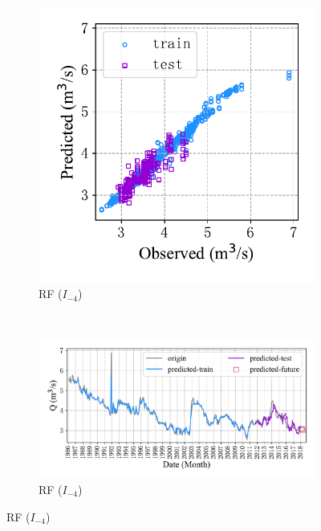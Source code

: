 \begin{figure}[!htbp]
\begin{subfigure}[b]{0.615\textwidth}
    \label{fig:spr_series_in_3_out_3_lstm}
  \end{subfigure}
  \\
  \begin{subfigure}[b]{0.305\textwidth}
    \includegraphics[width=\textwidth]{Img/chap4_spr/out3/spr_scatter_in_4_out_3_rf.pdf}
    \vspace{-1.2cm}
    \caption{RF ($I_{-4}$)}
    \label{fig:spr_scatter_in_4_out_3_rf}
  \end{subfigure}
  ~
  \begin{subfigure}[b]{0.615\textwidth}
    \includegraphics[width=\textwidth]{Img/chap4_spr/out3/spr_series_in_4_out_3_rf.pdf}
    \vspace{-1.2cm}
    \caption{RF ($I_{-4}$)}
    \label{fig:spr_series_in_4_out_3_rf}
  \end{subfigure}
  \label{fig:spr_out_3}
\end{figure}

